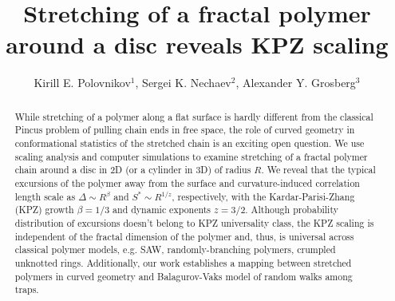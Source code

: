 \documentclass[aps,pre,floatfix,twocolumn,nofootinbib]{revtex4-2}
\begin{document}
\title{Stretching of a fractal polymer around a disc reveals KPZ scaling}

\author{Kirill E. Polovnikov$^1$, Sergei K. Nechaev$^{2}$, Alexander Y. Grosberg$^3$}



\begin{abstract}
While stretching of a polymer along a flat surface is hardly different from the classical Pincus problem of pulling chain ends in free space, the role of curved geometry in conformational statistics of the stretched chain is an exciting open question. We use scaling analysis and computer simulations to examine stretching of a fractal polymer chain around a disc in 2D (or a cylinder in 3D) of radius $R$.  We reveal that the typical excursions of the polymer away from the surface and curvature-induced correlation length scale as $\Delta \sim R^{\beta}$ and $S^{*} \sim R^{1/z}$, respectively, with the Kardar-Parisi-Zhang (KPZ) growth $\beta=1/3$ and dynamic exponents $z=3/2$.  Although probability distribution of excursions doesn't belong to KPZ universality class, the KPZ scaling is independent of the fractal dimension of the polymer and, thus, is universal across classical polymer models, e.g. SAW, randomly-branching polymers, crumpled unknotted rings. Additionally, our work establishes a mapping between stretched polymers in curved geometry and Balagurov-Vaks model of random walks among traps.

\end{abstract}



\maketitle

\end{document}
